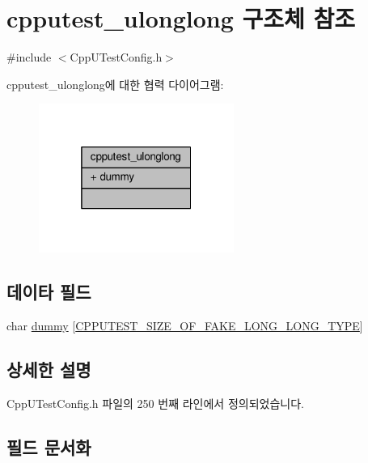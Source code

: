 \hypertarget{structcpputest__ulonglong}{}\section{cpputest\+\_\+ulonglong 구조체 참조}
\label{structcpputest__ulonglong}


{\ttfamily \#include $<$Cpp\+U\+Test\+Config.\+h$>$}



cpputest\+\_\+ulonglong에 대한 협력 다이어그램\+:
\nopagebreak
\begin{figure}[H]
\begin{center}
\leavevmode
\includegraphics[width=181pt]{structcpputest__ulonglong__coll__graph}
\end{center}
\end{figure}
\subsection*{데이타 필드}
\begin{DoxyCompactItemize}
\item 
char \hyperlink{structcpputest__ulonglong_a3aa94a3fffaef9e393bfe23c93aa6688}{dummy} \mbox{[}\hyperlink{_cpp_u_test_config_8h_a084cf63afb45ec9a8966002efa2d1f9a}{C\+P\+P\+U\+T\+E\+S\+T\+\_\+\+S\+I\+Z\+E\+\_\+\+O\+F\+\_\+\+F\+A\+K\+E\+\_\+\+L\+O\+N\+G\+\_\+\+L\+O\+N\+G\+\_\+\+T\+Y\+PE}\mbox{]}
\end{DoxyCompactItemize}


\subsection{상세한 설명}


Cpp\+U\+Test\+Config.\+h 파일의 250 번째 라인에서 정의되었습니다.



\subsection{필드 문서화}
